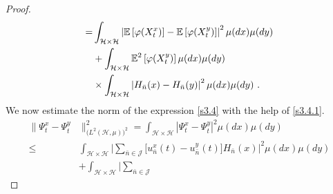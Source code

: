 \documentclass[review,onefignum,onetabnum]{siamart190516}
\begin{document}
\begin{proof}
\begin{equation}
\begin{aligned}
                    =&
                    \int_{\mathcal{H}\times \mathcal{H}}
                    \left|
                            \E 
                            \left [
                                \varphi(X_t^x)
                            \right]
                            -
                            \E\left[
                                \varphi(X_t^y)
                            \right]
                        \right|^2
                        \mu(dx) \mu(dy)
                    \\
                    &+
                    \int_{\mathcal{H}\times \mathcal{H}}
                        \E^2
                        \left[
                            \varphi(X_t^y)
                        \right]
                    \mu(dx)\mu(dy)
                    \\
                    & \times
                    \int_{\mathcal{H}\times \mathcal{H}}
                    \left|
                        H_{\bar n}(x)
                            -
                            H_{\bar n}(y)
                    \right|^2
                    \mu(dx)\mu(dy)
                \ .
            \end{aligned}
            \label{s3.4.1}
        \end{equation}
        We now estimate the norm of the expression \eqref{s3.4} with the help of
        \eqref{s3.4.1}.
        \begin{equation}
        \label{s3.8.1}
            \begin{aligned}
                \| \Psi_t ^ x - \Psi_t ^ y & \|_{
                    \big(
                        L^2(\mathcal{H},\mu)
                    \big)^2
                }^2
                    =
                        \int_{\mathcal{H}\times \mathcal{H}}
                        |\Psi_t^x - \Psi_t^y|^2 \mu(dx) \mu(dy)
                    \\
                    \le&
                    \int_{\mathcal{H} \times \mathcal{H}}
                        \Big|
                            \sum_{\bar n\in \mathcal{J}}
                            \big[
                                u_{\bar n} ^ x(t) - u_{\bar n} ^ y(t)
                            \big]
                            H_{\bar n}(x)
                        \Big|^2
                        \mu(dx) \mu(dy)
                    \\
                    &+
                    \int_{\mathcal{H}\times \mathcal{H}}
                    \Big|
                        \sum_{\bar n\in \mathcal{J}}

\end{aligned}
\end{equation}
\end{proof}
\end{document}

